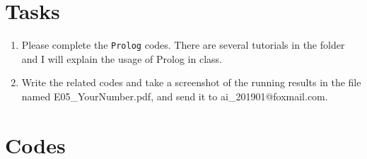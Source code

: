 ﻿\documentclass[a4paper, 11pt]{article}
\begin{document}
\section{Tasks}


\begin{enumerate}
\item Please complete the \texttt{Prolog} codes. There are several tutorials in the folder and I will explain the usage of Prolog in class.
\item Write the related codes and take a screenshot of the running results in the file named \textsf{E05\_YourNumber.pdf}, and send it to \textsf{ai\_201901@foxmail.com}.

\end{enumerate}
\section{Codes}
\lstset{language=C}
\end{document}
